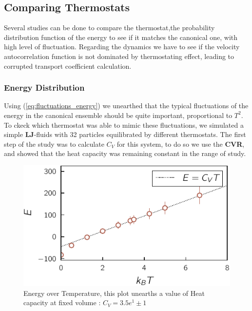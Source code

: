 \documentclass[ansiapaper]{report}
\begin{document}
\begin{multicols}{3}
\subsection{Comparing Thermostats}
Several studies can be done to compare the thermostat,the probability distribution function of the energy to see if it matches the canonical one, with high level of fluctuation. Regarding the dynamics we have to see if the velocity autocorrelation function is not dominated by thermostating effect, leading to corrupted transport coefficient calculation. 
\subsubsection{Energy Distribution}
Using (\ref{eq:fluctuations_energy}) we unearthed that the typical fluctuations of the energy in the canonical ensemble should be quite important, proportional to $T^2$. To ckeck which thermostat was able to mimic these fluctuations, we simulated a simple \textbf{LJ}-fluids with 32 particles equilibrated by different thermostats. The first step of the study was to calculate $C_V$ for this system, to do so we use the \textbf{CVR}, and showed that the heat capacity was remaining constant in the range of study. 
\begin{figure}[H]
    \begin{center}
        \includegraphics[width=1\linewidth]{figures/MD_energy_temperature.pdf}
    \end{center}
    \caption{Energy over Temperature, this plot unearths a value of Heat capacity at fixed volume : $C_V = 3.5e^1 \pm 1$}\label{fig:HC}
\end{figure}


\end{multicols}
\end{document}

